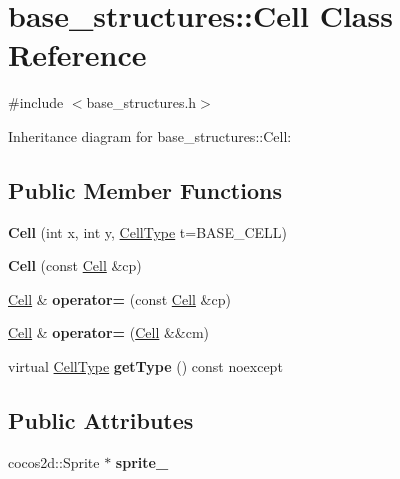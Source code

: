 \hypertarget{classbase__structures_1_1Cell}{}\section{base\+\_\+structures\+:\+:Cell Class Reference}
\label{classbase__structures_1_1Cell}


{\ttfamily \#include $<$base\+\_\+structures.\+h$>$}



Inheritance diagram for base\+\_\+structures\+:\+:Cell\+:
\subsection*{Public Member Functions}
\begin{DoxyCompactItemize}
\item 
\mbox{\label{classbase__structures_1_1Cell_a5c81b06149de2332c5a700595b25a839}} 
{\bfseries Cell} (int x, int y, \hyperlink{group__map__interface_ga7a79b122dbd494c4eea32680c5df34c1}{Cell\+Type} t=B\+A\+S\+E\+\_\+\+C\+E\+LL)
\item 
\mbox{\label{classbase__structures_1_1Cell_a674183cd03491c39a3da334db9db822a}} 
{\bfseries Cell} (const \hyperlink{classbase__structures_1_1Cell}{Cell} \&cp)
\item 
\mbox{\label{classbase__structures_1_1Cell_ac6cd39f82cb9a7166d95e0284ffbe13e}} 
\hyperlink{classbase__structures_1_1Cell}{Cell} \& {\bfseries operator=} (const \hyperlink{classbase__structures_1_1Cell}{Cell} \&cp)
\item 
\mbox{\label{classbase__structures_1_1Cell_aa11371910b8e12ba026eb5c68846f74e}} 
\hyperlink{classbase__structures_1_1Cell}{Cell} \& {\bfseries operator=} (\hyperlink{classbase__structures_1_1Cell}{Cell} \&\&cm)
\item 
\mbox{\label{classbase__structures_1_1Cell_a4406058ea8d05c526b315fd990fe2818}} 
virtual \hyperlink{group__map__interface_ga7a79b122dbd494c4eea32680c5df34c1}{Cell\+Type} {\bfseries get\+Type} () const noexcept
\end{DoxyCompactItemize}
\subsection*{Public Attributes}
\begin{DoxyCompactItemize}
\item 
\mbox{\label{classbase__structures_1_1Cell_ae29879955d77f2b9a3cb50e231dec0ff}} 
cocos2d\+::\+Sprite $\ast$ {\bfseries sprite\+\_\+}
\end{DoxyCompactItemize}
